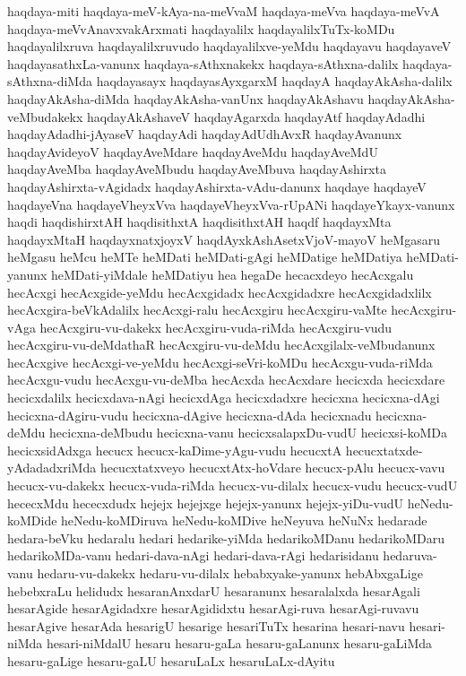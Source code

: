 {haqdaya-miti
haqdaya-meV-kAya-na-meVvaM
haqdaya-meVva
haqdaya-meVvA
haqdaya-meVvAnavxvakArxmati
haqdayalilx
haqdayalilxTuTx-koMDu
haqdayalilxruva
haqdayalilxruvudo
haqdayalilxve-yeMdu
haqdayavu
haqdayaveV
haqdayasathxLa-vanunx
haqdaya-sAthxnakekx
haqdaya-sAthxna-dalilx
haqdaya-sAthxna-diMda
haqdayasayx
haqdayasAyxgarxM
haqdayA
haqdayAkAsha-dalilx
haqdayAkAsha-diMda
haqdayAkAsha-vanUnx
haqdayAkAshavu
haqdayAkAsha-veMbudakekx
haqdayAkAshaveV
haqdayAgarxda
haqdayAtf
haqdayAdadhi
haqdayAdadhi-jAyaseV
haqdayAdi
haqdayAdUdhAvxR
haqdayAvanunx
haqdayAvideyoV
haqdayAveMdare
haqdayAveMdu
haqdayAveMdU
haqdayAveMba
haqdayAveMbudu
haqdayAveMbuva
haqdayAshirxta
haqdayAshirxta-vAgidadx
haqdayAshirxta-vAdu-danunx
haqdaye
haqdayeV
haqdayeVna
haqdayeVheyxVva
haqdayeVheyxVva-rUpANi
haqdayeYkayx-vanunx
haqdi
haqdishirxtAH
haqdisithxtA
haqdisithxtAH
haqdf
haqdayxMta
haqdayxMtaH
haqdayxnatxjoyxV
haqdAyxkAshAsetxVjoV-mayoV
heMgasaru
heMgasu
heMcu
heMTe
heMDati
heMDati-gAgi
heMDatige
heMDatiya
heMDati-yanunx
heMDati-yiMdale
heMDatiyu
hea
hegaDe
hecacxdeyo
hecAcxgalu
hecAcxgi
hecAcxgide-yeMdu
hecAcxgidadx
hecAcxgidadxre
hecAcxgidadxlilx
hecAcxgira-beVkAdalilx
hecAcxgi-ralu
hecAcxgiru
hecAcxgiru-vaMte
hecAcxgiru-vAga
hecAcxgiru-vu-dakekx
hecAcxgiru-vuda-riMda
hecAcxgiru-vudu
hecAcxgiru-vu-deMdathaR
hecAcxgiru-vu-deMdu
hecAcxgilalx-veMbudanunx
hecAcxgive
hecAcxgi-ve-yeMdu
hecAcxgi-seVri-koMDu
hecAcxgu-vuda-riMda
hecAcxgu-vudu
hecAcxgu-vu-deMba
hecAcxda
hecAcxdare
hecicxda
hecicxdare
hecicxdalilx
hecicxdava-nAgi
hecicxdAga
hecicxdadxre
hecicxna
hecicxna-dAgi
hecicxna-dAgiru-vudu
hecicxna-dAgive
hecicxna-dAda
hecicxnadu
hecicxna-deMdu
hecicxna-deMbudu
hecicxna-vanu
hecicxsalapxDu-vudU
hecicxsi-koMDa
hecicxsidAdxga
hecucx
hecucx-kaDime-yAgu-vudu
hecucxtA
hecucxtatxde-yAdadadxriMda
hecucxtatxveyo
hecucxtAtx-hoVdare
hecucx-pAlu
hecucx-vavu
hecucx-vu-dakekx
hecucx-vuda-riMda
hecucx-vu-dilalx
hecucx-vudu
hecucx-vudU
hececxMdu
hececxdudx
hejejx
hejejxge
hejejx-yanunx
hejejx-yiDu-vudU
heNedu-koMDide
heNedu-koMDiruva
heNedu-koMDive
heNeyuva
heNuNx
hedarade
hedara-beVku
hedaralu
hedari
hedarike-yiMda
hedarikoMDanu
hedarikoMDaru
hedarikoMDa-vanu
hedari-dava-nAgi
hedari-dava-rAgi
hedarisidanu
hedaruva-vanu
hedaru-vu-dakekx
hedaru-vu-dilalx
hebabxyake-yanunx
hebAbxgaLige
hebebxraLu
helidudx
hesaranAnxdarU
hesaranunx
hesaralalxda
hesarAgali
hesarAgide
hesarAgidadxre
hesarAgididxtu
hesarAgi-ruva
hesarAgi-ruvavu
hesarAgive
hesarAda
hesarigU
hesarige
hesariTuTx
hesarina
hesari-navu
hesari-niMda
hesari-niMdalU
hesaru
hesaru-gaLa
hesaru-gaLanunx
hesaru-gaLiMda
hesaru-gaLige
hesaru-gaLU
hesaruLaLx
hesaruLaLx-dAyitu
}
